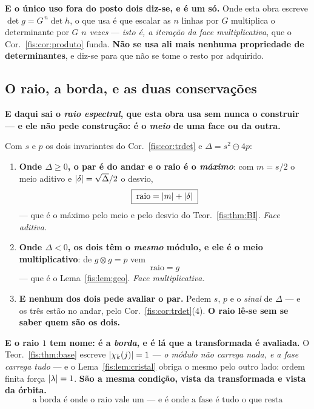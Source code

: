 \documentclass[livro.tex]{subfiles}
\begin{document}
\medskip\noindent\textbf{E o único uso fora do posto dois diz-se, e é um só.} Onde
esta obra escreve $\det g=G^{\,n}\det h$, o que usa é que escalar as $n$ linhas por
$G$ multiplica o determinante por $G$ \emph{$n$ vezes} --- \emph{isto é, a iteração
da face multiplicativa}, que o Cor.~\ref{fis:cor:produto} funda. \textbf{Não se usa
ali mais nenhuma propriedade de determinantes}, e diz-se para que não se tome o
resto por adquirido.

\subsection*{O raio, a borda, e as duas conservações}

\noindent\textbf{E daqui sai o \emph{raio espectral}, que esta obra usa sem nunca o
construir --- e ele não pede construção: é o \emph{meio} de uma face ou da outra.}

\begin{corolario}\label{fis:cor:raio}
Com $s$ e $p$ os dois invariantes do Cor.~\ref{fis:cor:trdet} e
$\Delta=s^{2}\ominus4p$:
\begin{enumerate}\itemsep3pt
\item[(1)] \textbf{Onde $\Delta\ge0$, o par é do andar e o raio é o \emph{máximo}}:
com $m=s/2$ o meio aditivo e $\lvert \delta\rvert=\sqrt{\Delta}/2$ o desvio,
\[
\boxed{\;\text{raio}=\lvert m\rvert+\lvert \delta\rvert\;}
\]
--- que é o máximo pelo meio e pelo desvio do Teor.~\ref{fis:thm:BI}. \emph{Face
aditiva.}
\item[(2)] \textbf{Onde $\Delta<0$, os dois têm o \emph{mesmo} módulo, e ele é o
meio multiplicativo}: de $g\otimes g=p$ vem
\[
\boxed{\;\text{raio}=g\;}
\]
--- que é o Lema~\ref{fis:lem:geo}. \emph{Face multiplicativa.}
\item[(3)] \textbf{E nenhum dos dois pede avaliar o par.} Pedem $s$, $p$ e o
\emph{sinal} de $\Delta$ --- e os três estão no andar, pelo
Cor.~\ref{fis:cor:trdet}(4). \textbf{O raio lê-se sem se saber quem são os dois.}
\end{enumerate}
\end{corolario}


\medskip\noindent\textbf{E o raio $1$ tem nome: é a \emph{borda}, e é lá que a
transformada é avaliada.} O Teor.~\ref{fis:thm:base} escreve
$\lvert \chi_k(j)\rvert=1$ --- \emph{o módulo não carrega nada, e a fase carrega tudo} ---
e o Lema~\ref{fis:lem:cristal} obriga o mesmo pelo outro lado: ordem finita força
$\lvert \lambda\rvert=1$. \textbf{São a mesma condição, vista da transformada e vista da
órbita.}
\[
\boxed{\;\text{a borda é onde o raio vale um --- e é onde a fase é tudo o que resta}\;}
\]
\end{document}
